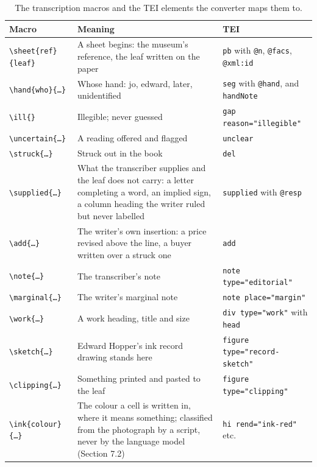 \documentclass[11pt]{article}
\begin{document}
\begin{table}[htbp]\centering\small
\caption{The transcription macros and the TEI elements the converter maps them to.}\label{tab:macros}
\begin{tabular}{lp{6.2cm}l}\toprule
Macro & Meaning & TEI\\\midrule
\texttt{\textbackslash sheet\{ref\}\{leaf\}} & A sheet begins: the museum's reference, the leaf written on the paper & \texttt{pb} with \texttt{@n}, \texttt{@facs}, \texttt{@xml:id}\\
\texttt{\textbackslash hand\{who\}\{…\}} & Whose hand: jo, edward, later, unidentified & \texttt{seg} with \texttt{@hand}, and \texttt{handNote}\\
\texttt{\textbackslash ill\{\}} & Illegible; never guessed & \texttt{gap reason="illegible"}\\
\texttt{\textbackslash uncertain\{…\}} & A reading offered and flagged & \texttt{unclear}\\
\texttt{\textbackslash struck\{…\}} & Struck out in the book & \texttt{del}\\
\texttt{\textbackslash supplied\{…\}} & What the transcriber supplies and the leaf does not carry: a letter completing a word, an implied sign, a column heading the writer ruled but never labelled & \texttt{supplied} with \texttt{@resp}\\
\texttt{\textbackslash add\{…\}} & The writer's own insertion: a price revised above the line, a buyer written over a struck one & \texttt{add}\\
\texttt{\textbackslash note\{…\}} & The transcriber's note & \texttt{note type="editorial"}\\
\texttt{\textbackslash marginal\{…\}} & The writer's marginal note & \texttt{note place="margin"}\\
\texttt{\textbackslash work\{…\}} & A work heading, title and size & \texttt{div type="work"} with \texttt{head}\\
\texttt{\textbackslash sketch\{…\}} & Edward Hopper's ink record drawing stands here & \texttt{figure type="record-sketch"}\\
\texttt{\textbackslash clipping\{…\}} & Something printed and pasted to the leaf & \texttt{figure type="clipping"}\\
\texttt{\textbackslash ink\{colour\}\{…\}} & The colour a cell is written in, where it means something; classified from the photograph by a script, never by the language model (Section 7.2) & \texttt{hi rend="ink-red"} etc.\\

\end{tabular}
\end{table}
\end{document}

